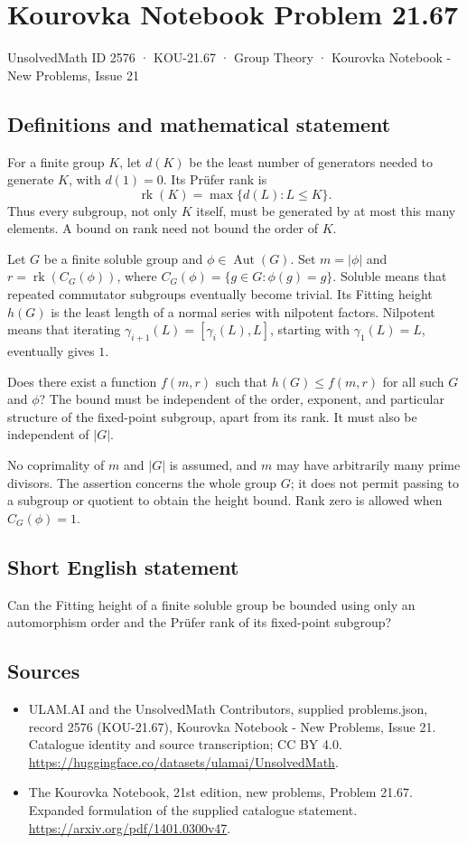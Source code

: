 \documentclass[11pt,a4paper]{article}
\begin{document}
\section*{Kourovka Notebook Problem 21.67}\label{2576}
{\small UnsolvedMath ID 2576 · KOU-21.67 · Group Theory · Kourovka Notebook - New Problems, Issue 21}
\subsection{Definitions and mathematical statement}
For a finite group $K$, let $d(K)$ be the least number of generators
needed to generate $K$, with $d(1)=0$. Its Pr\"ufer rank is
\[
 \operatorname{rk}(K)=\max\{d(L):L\le K\}.
\]
Thus every subgroup, not only $K$ itself, must be generated by at most
this many elements. A bound on rank need not bound the order of $K$.

Let $G$ be a finite soluble group and $\phi\in\operatorname{Aut}(G)$.
Set $m=|\phi|$ and
$r=\operatorname{rk}(C_G(\phi))$, where
$C_G(\phi)=\{g\in G:\phi(g)=g\}$.
Soluble means that repeated commutator subgroups eventually become
trivial. Its Fitting height $h(G)$ is the least length of a normal
series with nilpotent factors. Nilpotent means that iterating
$\gamma_{i+1}(L)=[\gamma_i(L),L]$, starting with $\gamma_1(L)=L$,
eventually gives $1$.

Does there exist a function $f(m,r)$ such that
$h(G)\le f(m,r)$ for all such $G$ and $\phi$?
The bound must be independent of the order, exponent, and particular
structure of the fixed-point subgroup, apart from its rank. It must
also be independent of $|G|$.

No coprimality of $m$ and $|G|$ is assumed, and $m$ may have arbitrarily
many prime divisors. The assertion concerns the whole group $G$; it
does not permit passing to a subgroup or quotient to obtain the
height bound. Rank zero is allowed when $C_G(\phi)=1$.
\subsection{Short English statement}
Can the Fitting height of a finite soluble group be bounded using only an automorphism order and the Prüfer rank of its fixed-point subgroup?
\subsection{Sources}
\begin{itemize}
\item[S1] ULAM.AI and the UnsolvedMath Contributors, supplied problems.json, record 2576 (KOU-21.67), Kourovka Notebook - New Problems, Issue 21. Catalogue identity and source transcription; CC BY 4.0.
\url{https://huggingface.co/datasets/ulamai/UnsolvedMath}.
\item[S2] The Kourovka Notebook, 21st edition, new problems, Problem 21.67. Expanded formulation of the supplied catalogue statement.
\url{https://arxiv.org/pdf/1401.0300v47}.
\end{itemize}
\end{document}
